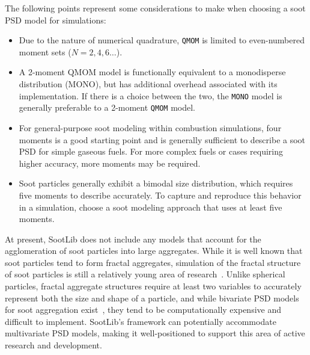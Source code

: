 \documentclass[preprint,letterpaper]{elsarticle}
\begin{document}
The following points represent some considerations to make when choosing a soot PSD model for simulations:
\begin{itemize}
    \item Due to the nature of numerical quadrature, \texttt{QMOM} is limited to even-numbered moment sets ($N=2,4,6\ldots$).
    \item A 2-moment QMOM model is functionally equivalent to a monodisperse distribution (MONO), but has additional overhead associated with its implementation. If there is a choice between the two, the \texttt{MONO} model is generally preferable to a 2-moment \texttt{QMOM} model.
    \item For general-purpose soot modeling within combustion simulations, four moments is a good starting point and is generally sufficient to describe a soot PSD for simple gaseous fuels. For more complex fuels or cases requiring higher accuracy, more moments may be required.
    \item Soot particles generally exhibit a bimodal size distribution, which requires five moments to describe accurately. To capture and reproduce this behavior in a simulation, choose a soot modeling approach that uses at least five moments.
\end{itemize}

At present, SootLib does not include any models that account for the agglomeration of soot particles into large aggregates. While it is well known that soot particles tend to form fractal aggregates, simulation of the fractal structure of soot particles is still a relatively young area of research~\cite{Patterson_2007}. Unlike spherical particles, fractal aggregate structures require at least two variables to accurately represent both the size and shape of a particle, and while bivariate PSD models for soot aggregation exist~\cite{Wright_2001,Mueller_2009,Blanquart_2009c}, they tend to be computationally expensive and difficult to implement. SootLib's framework can potentially accommodate multivariate PSD models, making it well-positioned to support this area of active research and development.
\end{document}
